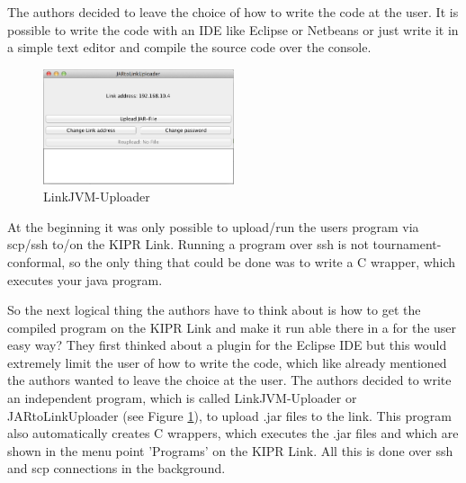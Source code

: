 \documentclass{juniorjournal}
\begin{document}
The authors decided to leave the choice of how to write the code at the user. It 
is possible to write the code with an IDE like Eclipse or Netbeans or just write 
it in a simple text editor and compile the source code over the console.

\begin{figure}[H]
\centering
\includegraphics[width=0.5\textwidth]{images/linkjvm_uploader.jpg}
\caption{LinkJVM-Uploader}
\label{fig:linkjvm_uploader}
\end{figure}

At the beginning it was only possible to upload/run the users program via scp/ssh to/on the KIPR Link.
Running a program over ssh is not tournament-conformal, so the only thing that could be done 
was to write a C wrapper, which executes your java program.

So the next logical thing the authors have to think about is how to get the compiled 
program on the KIPR Link and make it run able there in a for the user easy way?
They first thinked about a plugin for the Eclipse IDE but this would extremely 
limit the user of how to write the code, which like already mentioned the 
authors wanted to leave the choice at the user.
The authors decided to write an independent program, which is called 
LinkJVM-Uploader or JARtoLinkUploader (see Figure \ref{fig:linkjvm_uploader}), 
to upload .jar files to the link. This program also automatically creates C 
wrappers, which executes the .jar files and which are shown in the menu point 
'Programs' on the KIPR Link. All this is done over ssh and scp connections in 
the background.

\begin{thebibliography}{500} %

\end{thebibliography}
\end{document}
